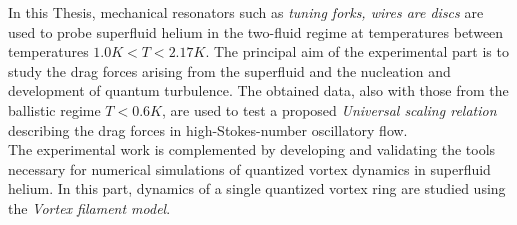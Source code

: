 In this Thesis, mechanical resonators such as \textit{tuning forks, wires are discs} are used to probe superfluid helium in the two-fluid regime at temperatures between temperatures $1.0\unit{K} < T < 2.17\unit{K}$. The principal aim of the experimental part is to study the drag forces arising from the superfluid and the nucleation and development of quantum turbulence. The obtained data, also with those from the ballistic regime $ T < 0.6\unit{K}$, are used to test a proposed \textit{Universal scaling relation} describing the drag forces in high-Stokes-number oscillatory flow.\\
The experimental work is complemented by developing and validating the tools necessary for numerical simulations of quantized vortex dynamics in superfluid helium. In this part, dynamics of a single quantized vortex ring are studied using the \textit{Vortex filament model}.
